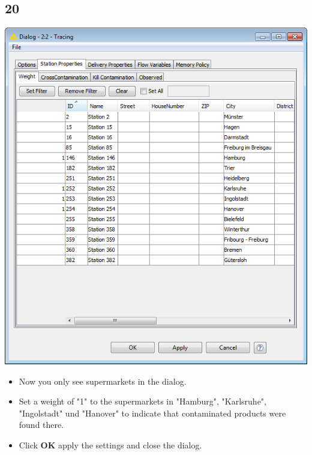 \documentclass{beamer}
\begin{document}
\subsection{20}
\begin{frame}
	\begin{center}
  		\includegraphics[height=0.6\textheight]{20.png}
	\end{center}
	\begin{itemize}
		\item Now you only see supermarkets in the dialog.
		\item Set a weight of "1" to the supermarkets in "Hamburg", "Karlsruhe", "Ingolstadt" und "Hanover" to indicate that contaminated products were found there.
		\item Click \textbf{OK} apply the settings and close the dialog.
	\end{itemize}
\end{frame}
\end{document}
